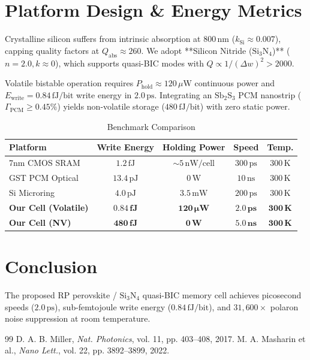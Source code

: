 \documentclass[10pt, conference]{IEEEtran}
\begin{document}
\section{Platform Design \& Energy Metrics}
Crystalline silicon suffers from intrinsic absorption at $800\,\text{nm}$ ($k_{\text{Si}} \approx 0.007$), capping quality factors at $Q_{\text{abs}} \approx 260$. We adopt **Silicon Nitride ($\text{Si}_3\text{N}_4$)** ($n = 2.0, k \approx 0$), which supports quasi-BIC modes with $Q \propto 1/(\Delta w)^2 > 2000$.

Volatile bistable operation requires $P_{\text{hold}} \approx 120\,\mu\text{W}$ continuous power and $E_{\text{write}} = 0.84\,\text{fJ/bit}$ write energy in $2.0\,\text{ps}$. Integrating an $\text{Sb}_2\text{S}_3$ PCM nanostrip ($\Gamma_{\text{PCM}} \ge 0.45\%$) yields non-volatile storage ($480\,\text{fJ/bit}$) with zero static power.

\begin{table}[htbp]
\caption{Benchmark Comparison}
\centering
\begin{tabular}{lcccc}
\toprule
\textbf{Platform} & \textbf{Write Energy} & \textbf{Holding Power} & \textbf{Speed} & \textbf{Temp.} \\
\midrule
7nm CMOS SRAM & $1.2\,\text{fJ}$ & $\sim 5\,\text{nW/cell}$ & $300\,\text{ps}$ & $300\,\text{K}$ \\
GST PCM Optical & $13.4\,\text{pJ}$ & $0\,\text{W}$ & $10\,\text{ns}$ & $300\,\text{K}$ \\
Si Microring & $4.0\,\text{pJ}$ & $3.5\,\text{mW}$ & $200\,\text{ps}$ & $300\,\text{K}$ \\
\textbf{Our Cell (Volatile)} & $\mathbf{0.84\,\text{fJ}}$ & $\mathbf{120\,\mu\text{W}}$ & $\mathbf{2.0\,\text{ps}}$ & $\mathbf{300\,\text{K}}$ \\
\textbf{Our Cell (NV)} & $\mathbf{480\,\text{fJ}}$ & $\mathbf{0\,\text{W}}$ & $\mathbf{5.0\,\text{ns}}$ & $\mathbf{300\,\text{K}}$ \\
\bottomrule
\end{tabular}
\end{table}

\section{Conclusion}
The proposed RP perovskite / $\text{Si}_3\text{N}_4$ quasi-BIC memory cell achieves picosecond speeds ($2.0\,\text{ps}$), sub-femtojoule write energy ($0.84\,\text{fJ/bit}$), and $31{,}600\times$ polaron noise suppression at room temperature.

\begin{thebibliography}{99}
 D. A. B. Miller, \textit{Nat. Photonics}, vol. 11, pp. 403--408, 2017.
 M. A. Masharin et al., \textit{Nano Lett.}, vol. 22, pp. 3892--3899, 2022.
\end{thebibliography}
\end{document}
